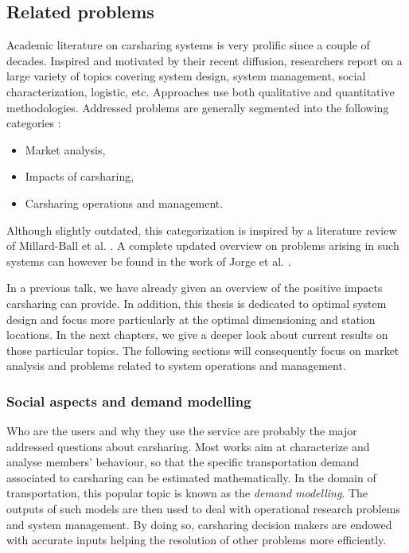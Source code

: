 \begin{bibunit}[ieeetr]
\subsection{Related problems}

Academic literature on carsharing systems is very prolific since a couple of decades.
Inspired and motivated by their recent diffusion, researchers report on a large variety of topics covering system design, system management, social characterization, logistic, etc.
Approaches use both qualitative and quantitative methodologies.
Addressed problems are generally segmented into the following categories \cite{ciari_sharing_2012}:
\begin{itemize}
\item Market analysis,
\item Impacts of carsharing,
\item Carsharing operations and management.
\end{itemize}

Although slightly outdated, this categorization is inspired by a literature review of Millard-Ball et al. \cite{millard_ball_car_sharing_2005}.
A complete updated overview on problems arising in such systems can however be found in the work of Jorge et al. \cite{jorge_carsharing_2013}.

\medskip
In a previous talk, we have already given an overview of the positive impacts carsharing can provide.
In addition, this thesis is dedicated to optimal system design and focus more particularly at the optimal dimensioning and station locations.
In the next chapters, we give a deeper look about current results on those particular topics.
The following sections will consequently focus on market analysis and problems related to system operations and management.


\subsubsection{Social aspects and demand modelling}
Who are the users and why they use the service are probably the major addressed questions about carsharing.
Most works aim at characterize and analyse members' behaviour, so that the specific transportation demand associated to carsharing can be estimated mathematically.
In the domain of transportation, this popular topic is known as the \emph{demand modelling}.
The outputs of such models are then used to deal with operational research problems and system management.
By doing so, carsharing decision makers are endowed with accurate inputs helping the resolution of other problems more efficiently.


\end{bibunit}

